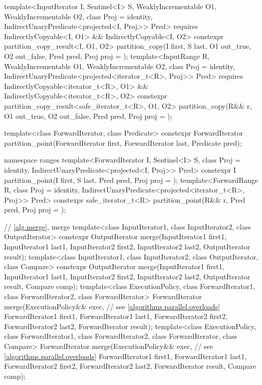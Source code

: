 \begin{codeblock}
{{    template<InputIterator I, Sentinel<I> S, WeaklyIncrementable O1, WeaklyIncrementable O2,
             class Proj = identity, IndirectUnaryPredicate<projected<I, Proj>> Pred>
      requires IndirectlyCopyable<I, O1> && IndirectlyCopyable<I, O2>
      constexpr partition_copy_result<I, O1, O2>
        partition_copy(I first, S last, O1 out_true, O2 out_false, Pred pred,
                       Proj proj = {});
    template<InputRange R, WeaklyIncrementable O1, WeaklyIncrementable O2,
             class Proj = identity,
             IndirectUnaryPredicate<projected<iterator_t<R>, Proj>> Pred>
      requires IndirectlyCopyable<iterator_t<R>, O1> &&
               IndirectlyCopyable<iterator_t<R>, O2>
      constexpr partition_copy_result<safe_iterator_t<R>, O1, O2>
        partition_copy(R&& r, O1 out_true, O2 out_false, Pred pred, Proj proj = {});
  }

  template<class ForwardIterator, class Predicate>
    constexpr ForwardIterator
      partition_point(ForwardIterator first, ForwardIterator last,
                      Predicate pred);

  namespace ranges {
    template<ForwardIterator I, Sentinel<I> S, class Proj = identity,
             IndirectUnaryPredicate<projected<I, Proj>> Pred>
      constexpr I partition_point(I first, S last, Pred pred, Proj proj = {});
    template<ForwardRange R, class Proj = identity,
             IndirectUnaryPredicate<projected<iterator_t<R>, Proj>> Pred>
      constexpr safe_iterator_t<R>
        partition_point(R&& r, Pred pred, Proj proj = {});
  }

  // \ref{alg.merge}, merge
  template<class InputIterator1, class InputIterator2, class OutputIterator>
    constexpr OutputIterator
      merge(InputIterator1 first1, InputIterator1 last1,
            InputIterator2 first2, InputIterator2 last2,
            OutputIterator result);
  template<class InputIterator1, class InputIterator2, class OutputIterator,
           class Compare>
    constexpr OutputIterator
      merge(InputIterator1 first1, InputIterator1 last1,
            InputIterator2 first2, InputIterator2 last2,
            OutputIterator result, Compare comp);
  template<class ExecutionPolicy, class ForwardIterator1, class ForwardIterator2,
           class ForwardIterator>
    ForwardIterator
      merge(ExecutionPolicy&& exec, // see \ref{algorithms.parallel.overloads}
            ForwardIterator1 first1, ForwardIterator1 last1,
            ForwardIterator2 first2, ForwardIterator2 last2,
            ForwardIterator result);
  template<class ExecutionPolicy, class ForwardIterator1, class ForwardIterator2,
           class ForwardIterator, class Compare>
    ForwardIterator
      merge(ExecutionPolicy&& exec, // see \ref{algorithms.parallel.overloads}
            ForwardIterator1 first1, ForwardIterator1 last1,
            ForwardIterator2 first2, ForwardIterator2 last2,
            ForwardIterator result, Compare comp);

}
\end{codeblock}
